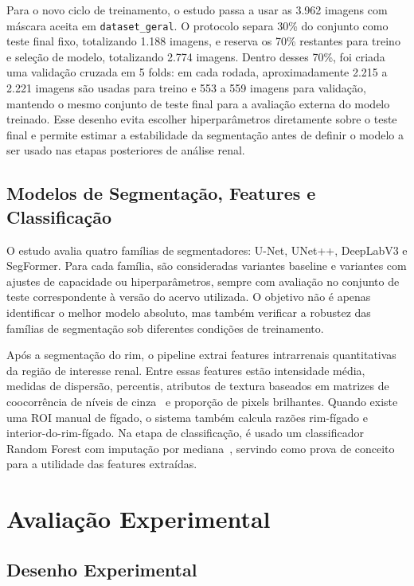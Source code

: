 \documentclass[12pt]{article}
\begin{document}
Para o novo ciclo de treinamento, o estudo passa a usar as 3.962 imagens com máscara aceita em \texttt{dataset\_geral}. O protocolo separa 30\% do conjunto como teste final fixo, totalizando 1.188 imagens, e reserva os 70\% restantes para treino e seleção de modelo, totalizando 2.774 imagens. Dentro desses 70\%, foi criada uma validação cruzada em 5 folds: em cada rodada, aproximadamente 2.215 a 2.221 imagens são usadas para treino e 553 a 559 imagens para validação, mantendo o mesmo conjunto de teste final para a avaliação externa do modelo treinado. Esse desenho evita escolher hiperparâmetros diretamente sobre o teste final e permite estimar a estabilidade da segmentação antes de definir o modelo a ser usado nas etapas posteriores de análise renal.

\subsection{Modelos de Segmentação, Features e Classificação}

O estudo avalia quatro famílias de segmentadores: U-Net, UNet++, DeepLabV3 e SegFormer. Para cada família, são consideradas variantes baseline e variantes com ajustes de capacidade ou hiperparâmetros, sempre com avaliação no conjunto de teste correspondente à versão do acervo utilizada. O objetivo não é apenas identificar o melhor modelo absoluto, mas também verificar a robustez das famílias de segmentação sob diferentes condições de treinamento.

Após a segmentação do rim, o pipeline extrai features intrarrenais quantitativas da região de interesse renal. Entre essas features estão intensidade média, medidas de dispersão, percentis, atributos de textura baseados em matrizes de coocorrência de níveis de cinza~\cite{Haralick1973} e proporção de pixels brilhantes. Quando existe uma ROI manual de fígado, o sistema também calcula razões rim-fígado e interior-do-rim-fígado. Na etapa de classificação, é usado um classificador Random Forest com imputação por mediana~\cite{Breiman2001}, servindo como prova de conceito para a utilidade das features extraídas.

\section{Avaliação Experimental}

\subsection{Desenho Experimental}
\end{document}
